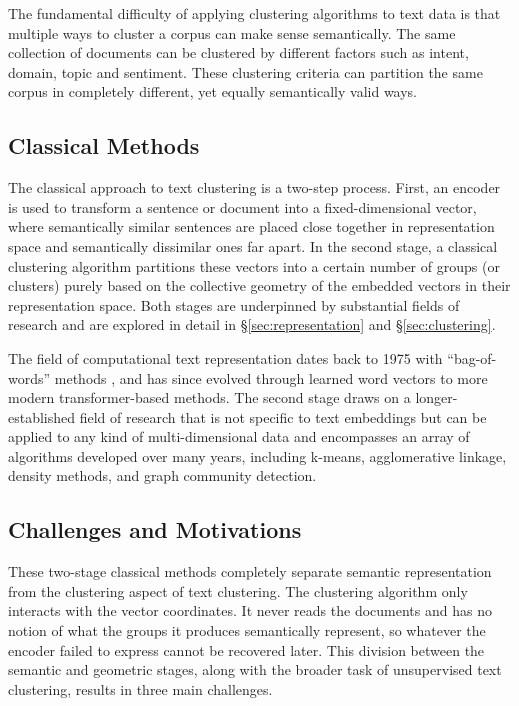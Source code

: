 \documentclass[11pt,a4paper,oneside]{report}
\begin{document}
The fundamental difficulty of applying clustering algorithms to text data is that multiple ways to cluster a corpus can make sense semantically. The same collection of documents can be clustered by different factors such as intent, domain, topic and sentiment. These clustering criteria can partition the same corpus in completely different, yet equally semantically valid ways.

\subsection{Classical Methods}

The classical approach to text clustering is a two-step process. First, an encoder is used to transform a sentence or document into a fixed-dimensional vector, where  semantically similar sentences are placed close together in representation space and semantically dissimilar ones far apart. In the second stage, a classical clustering algorithm partitions these vectors into a certain number of groups (or clusters) purely based on the collective geometry of the embedded vectors in their representation space. Both stages are underpinned by substantial fields of research and are explored in detail in \S\ref{sec:representation} and \S\ref{sec:clustering}.

The field of computational text representation dates back to 1975 with ``bag-of-words'' methods \citep{salton1975vector}, and has since evolved through learned word vectors to more modern transformer-based methods. The second stage draws on a longer-established field of research that is not specific to text embeddings but can be applied to any kind of multi-dimensional data and encompasses an array of algorithms developed over many years, including k-means, agglomerative linkage, density methods, and graph community detection.

\subsection{Challenges and Motivations}

These two-stage classical methods completely separate semantic representation from the clustering aspect of text clustering. The clustering algorithm only interacts with the vector coordinates. It never reads the documents and has no notion of what the groups it produces semantically represent, so whatever the encoder failed to express cannot be recovered later. This division between the semantic and geometric stages, along with the broader task of unsupervised text clustering, results in three main challenges.
\end{document}
